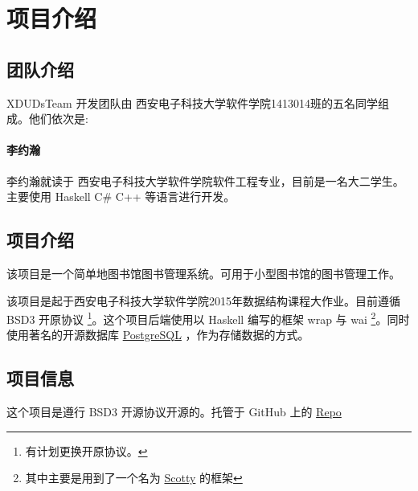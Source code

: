 

\section*{项目介绍}
\subsection*{团队介绍}
XDUDsTeam 开发团队由 西安电子科技大学软件学院1413014班的五名同学组成。他们依次是:
\paragraph{李约瀚} 李约瀚就读于 西安电子科技大学软件学院软件工程专业，目前是一名大二学生。
主要使用 Haskell C\# C++ 等语言进行开发。
\subsection*{项目介绍}
该项目是一个简单地图书馆图书管理系统。可用于小型图书馆的图书管理工作。

该项目是起于西安电子科技大学软件学院2015年数据结构课程大作业。目前遵循 BSD3 开原协议 \footnote{有计划更换开原协议。}。这个项目后端使用以 Haskell 编写的框架 wrap 与 wai \footnote{其中主要是用到了一个名为 \href{https://github.com/scotty-web/scotty}{Scotty} 的框架}。同时使用著名的开源数据库
\href{http://www.postgresql.org}{PostgreSQL} ，作为存储数据的方式。
\subsection*{项目信息}
这个项目是遵行 BSD3 开源协议开源的。托管于 GitHub 上的   \href{https://github.com/XDUDsTeam/}{Repo}